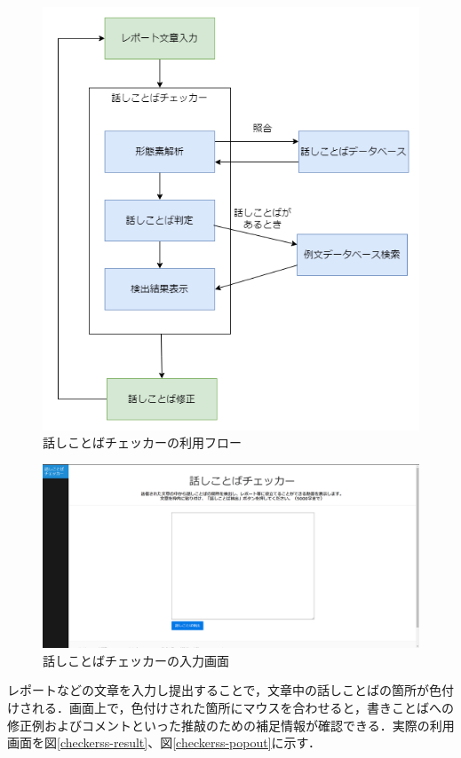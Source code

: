 \begin{figure}[H] %
	\centering
 	\includegraphics[width=120mm]{image/checker-flow.png}
	\caption{話しことばチェッカーの利用フロー}
	\label{checkerss-plain}
\end{figure}

\begin{figure}[H] %
	\centering
 	\includegraphics[width=150mm]{image/checkerss-plain.png}
	\caption{話しことばチェッカーの入力画面}
	\label{checkerss-plain}
\end{figure}

レポートなどの文章を入力し提出することで，文章中の話しことばの箇所が色付けされる．画面上で，色付けされた箇所にマウスを合わせると，書きことばへの修正例およびコメントといった推敲のための補足情報が確認できる．実際の利用画面を図\ref{checkerss-result}、図\ref{checkerss-popout}に示す．

